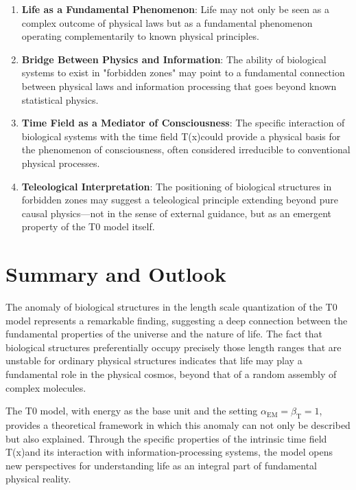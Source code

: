 \documentclass[12pt,a4paper]{article}
\newcommand{\Tfield}{T(x)}
\newcommand{\alphaEM}{\alpha_{\text{EM}}}
\newcommand{\betaT}{\beta_{\text{T}}}
\begin{document}
	\begin{enumerate}
		\item \textbf{Life as a Fundamental Phenomenon}: Life may not only be seen as a complex outcome of physical laws but as a fundamental phenomenon operating complementarily to known physical principles.
		
		\item \textbf{Bridge Between Physics and Information}: The ability of biological systems to exist in "forbidden zones" may point to a fundamental connection between physical laws and information processing that goes beyond known statistical physics.
		
		\item \textbf{Time Field as a Mediator of Consciousness}: The specific interaction of biological systems with the time field \Tfield could provide a physical basis for the phenomenon of consciousness, often considered irreducible to conventional physical processes.
		
		\item \textbf{Teleological Interpretation}: The positioning of biological structures in forbidden zones may suggest a teleological principle extending beyond pure causal physics—not in the sense of external guidance, but as an emergent property of the T0 model itself.
	\end{enumerate}
	
	\section{Summary and Outlook}
	\label{sec:zusammenfassung_ausblick}
	
	The anomaly of biological structures in the length scale quantization of the T0 model represents a remarkable finding, suggesting a deep connection between the fundamental properties of the universe and the nature of life. The fact that biological structures preferentially occupy precisely those length ranges that are unstable for ordinary physical structures indicates that life may play a fundamental role in the physical cosmos, beyond that of a random assembly of complex molecules.
	
	The T0 model, with energy as the base unit and the setting $\alphaEM = \betaT = 1$, provides a theoretical framework in which this anomaly can not only be described but also explained. Through the specific properties of the intrinsic time field \Tfield and its interaction with information-processing systems, the model opens new perspectives for understanding life as an integral part of fundamental physical reality.
	
\end{document}
